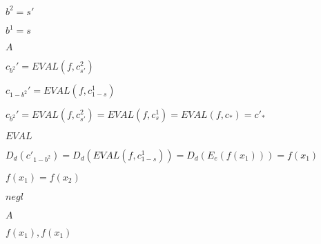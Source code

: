 \documentclass[10pt]{book}
\begin{document}
\begin{mdSnippets}
\begin{mdInlineSnippet}[bd4f1ad461acfe1e37901f68239436af]%
$b^2 = s'$\end{mdInlineSnippet}%
\begin{mdInlineSnippet}%
$b^1 = s$\end{mdInlineSnippet}%
\begin{mdInlineSnippet}[7fc56270e7a70fa81a5935b72eacbe29]%
$A$\end{mdInlineSnippet}%
\begin{mdInlineSnippet}[20af28375c3f4bd1571eeaf21b09ba87]%
$c_{b^2}' = EVAL(f,c_{s'}^2)$\end{mdInlineSnippet}%
\begin{mdInlineSnippet}[3bc9518377255b4a517d33f3aa217755]%
$c_{1-b^2}' = EVAL(f,c_{1-s}^1)$\end{mdInlineSnippet}%
\begin{mdInlineSnippet}%
$c_{b^2}' = EVAL(f,c_{s'}^2) = EVAL(f,c_{s}^1) = EVAL(f,c_*) = c'_*$\end{mdInlineSnippet}%
\begin{mdInlineSnippet}[1f8cb46fe06733d6f0dd650117e6ab66]%
$EVAL$\end{mdInlineSnippet}%
\begin{mdInlineSnippet}%
$D_d(c'_{1-b^2}) = D_d(EVAL(f,c_{1-s}^1)) = D_d(E_e(f(x_1))) = f(x_1)$\end{mdInlineSnippet}%
\begin{mdInlineSnippet}[4812639f20ab618f627d38471badda43]%
$f(x_1) = f(x_2)$\end{mdInlineSnippet}%
\begin{mdInlineSnippet}%
$negl$\end{mdInlineSnippet}%
\begin{mdInlineSnippet}[7fc56270e7a70fa81a5935b72eacbe29]%
$A$\end{mdInlineSnippet}%
\begin{mdInlineSnippet}[77ca460285b8a63734f6e58112fbf2a9]%
$f(x_1),f(x_1)$\end{mdInlineSnippet}%
\begin{mdInlineSnippet}[45f306c2cf0401bf58c4cd27332b1393]%

\end{mdInlineSnippet}
\end{mdSnippets}
\end{document}
